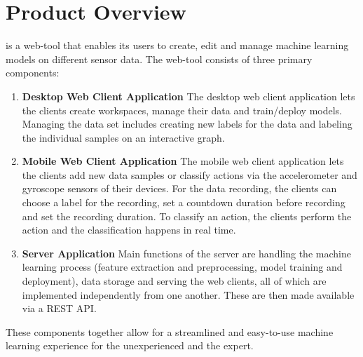 \section{Product Overview}

 {\pseProjectName} is a web-tool that enables its users to create, edit and manage machine learning models on different sensor data. The web-tool consists of three primary components:

\begin{enumerate}
    \item \textbf{Desktop Web Client Application}
    The desktop web client application lets the clients create workspaces, manage their data and train/deploy models. Managing the data set includes creating new labels for the data and labeling the individual samples on an interactive graph.

    \item \textbf{Mobile Web Client Application}
    The mobile web client application lets the clients add new data samples or classify actions via the accelerometer and gyroscope sensors of their devices. For the data recording, the clients can choose a label for the recording, set a countdown duration before recording and set the recording duration. To classify an action, the clients perform the action and the classification happens in real time.

    \item \textbf{Server Application}
     Main functions of the server are handling the machine learning process (feature extraction and preprocessing, model training and deployment), data storage and serving the web clients, all of which are implemented independently from one another. These are then made available via a REST API. 
     
\end{enumerate}

These components together allow for a streamlined and easy-to-use machine learning experience for the unexperienced and the expert.